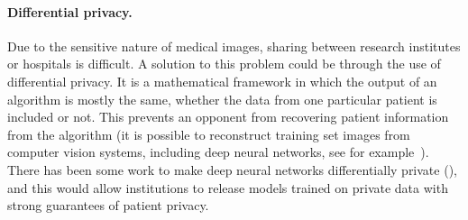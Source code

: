 \paragraph*{Differential privacy.}
Due to the sensitive nature of medical images, sharing between research institutes or hospitals is difficult. A solution to this problem could be through the use of differential privacy. It is a mathematical framework in which the output of an algorithm is mostly the same, whether the data from one particular patient is included or not. This prevents an opponent from recovering patient information from the algorithm (it is possible to reconstruct training set images from computer vision systems, including deep neural networks, see for example~\textcite{fredrikson2015}). There has been some work to make deep neural networks differentially private (\textcite{abadi2016}), and this would allow institutions to release models trained on private data with strong guarantees of patient privacy.




